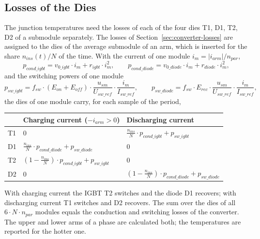 \subsection{Losses of the Dies}
\label{sec:die-losses}

The junction temperatures need the losses of each of the four dies T1, D1, T2, D2 of a submodule separately. The
losses of Section~\ref{sec:converter-losses} are assigned to the dies of the average submodule of an arm, which is
inserted for the share $n_{ins}(t) / N$ of the time. With the current of one module $i_m = |i_{arm}| / n_{par}$,
\begin{equation}
  p_{cond\_igbt} = v_{0\_igbt} \cdot i_m + r_{igbt} \cdot i_m^2 , \qquad
  p_{cond\_diode} = v_{0\_diode} \cdot i_m + r_{diode} \cdot i_m^2 ,
\end{equation}
and the switching powers of one module
\begin{equation}
  p_{sw\_igbt} = f_{sw} \cdot (E_{on} + E_{off}) \cdot \frac{u_{sm}}{U_{sw\_ref}} \cdot \frac{i_m}{I_{sw\_ref}} , \qquad
  p_{sw\_diode} = f_{sw} \cdot E_{rec} \cdot \frac{u_{sm}}{U_{sw\_ref}} \cdot \frac{i_m}{I_{sw\_ref}} ,
\end{equation}
the dies of one module carry, for each sample of the period,
\begin{center}
  \begin{tabular}{@{}l l l@{}}
    \toprule
    & \textbf{Charging current ($-i_{arm} > 0$)} & \textbf{Discharging current} \\
    \midrule
    T1 & 0 & $\frac{n_{ins}}{N} \cdot p_{cond\_igbt} + p_{sw\_igbt}$ \\
    D1 & $\frac{n_{ins}}{N} \cdot p_{cond\_diode} + p_{sw\_diode}$ & 0 \\
    T2 & $\left( 1 - \frac{n_{ins}}{N} \right) \cdot p_{cond\_igbt} + p_{sw\_igbt}$ & 0 \\
    D2 & 0 & $\left( 1 - \frac{n_{ins}}{N} \right) \cdot p_{cond\_diode} + p_{sw\_diode}$ \\
    \bottomrule
  \end{tabular}
\end{center}
With charging current the IGBT T2 switches and the diode D1 recovers; with discharging current T1 switches and D2
recovers. The sum over the dies of all $6 \cdot N \cdot n_{par}$ modules equals the conduction and switching losses
of the converter. The upper and lower arms of a phase are calculated both; the temperatures are reported for the
hotter one.
